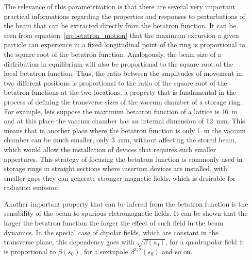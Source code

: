 \documentclass[
	12pt,				%
	openright,			%
	oneside,			%
	a4paper,		%
	chapter=TITLE,		%
	section=TITLE,		%
    brazil,				%
	english,			%
	sumario=tradicional,
	]{abntex2}
\begin{document}
	The relevance of this parametrization is that there are several very important practical informations regarding the properties and responses to perturbations of the beam that can be extracted directly from the betatron function. It can be seen from equation~\eqref{eq:betatron_motion} that the maximum excursion a given particle can experience in a fixed longitudinal point of the ring is proportional to the square root of the betatron function. Analogously, the beam size of a distribution in equilibrium will also be proportional to the square root of the local betatron function. Thus, the ratio between the amplitudes of movement in two different positions is proportional to the ratio of the square root of the betatron functions at the two locations, a property that is fundamental in the process of defining the transverse sizes of the vaccum chamber of a storage ring. For example, lets suppose the maximum betatron function of a lattice is \SI{16}{\meter} and at this place the vaccum chamber has an internal dimension of \SI{12}{\milli\meter}. This means that in another place where the betatron function is only \SI{1}{\meter} the vaccum chamber can be much smaller, only \SI{3}{\milli\meter}, without affecting the stored beam, which would allow the installation of devices that requires such smaller appertures. This strategy of focusing the betatron function is commonly used in storage rings in straight sections where insertion devices are installed, with smaller gaps they can generate stronger magnetic fields, which is desirable for radiation emission.

	Another important property that can be infered from the betatron function is the sensibility of the beam to spurious eletromagnetic fields. It can be shown that the larger the betatron function the larger the effect of such field in the beam dynamics. In the special case of dipolar fields, which are constant in the transverse plane, this dependency goes with $\sqrt{\beta(s_0)}$, for a quadrupolar field it is proportional to $\beta(s_0)$, for a sextupole $\beta^{3/2}(s_0)$ and so on.
\end{document}
